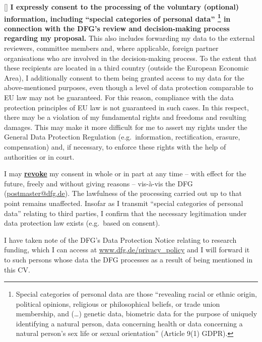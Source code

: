 \documentclass{scrartcl}
\begin{document}
\begin{small}
[\hspace{1em}]
\textbf{I expressly consent to the processing of the voluntary (optional) information, including ``special categories of personal data''%
\footnote{Special categories of personal data are those ``revealing racial or ethnic origin, political opinions, religious or philosophical beliefs, or trade union membership, and (\dots) genetic data, biometric data for the purpose of uniquely identifying a natural person, data concerning health or data concerning a natural person's sex life or sexual orientation'' (Article 9(1) GDPR).
} in connection with the DFG's review and decision-making process regarding my proposal.}
This also includes forwarding my data to the external reviewers, committee members and, where applicable, foreign partner organisations who are involved in the decision-making process.
To the extent that these recipients are located in a third country (outside the European Economic Area), I additionally consent to them being granted access to my data for the above-mentioned purposes, even though a level of data protection comparable to EU law may not be guaranteed.
For this reason, compliance with the data protection principles of EU law is not guaranteed in such cases.
In this respect, there may be a violation of my fundamental rights and freedoms and resulting damages.
This may make it more difficult for me to assert my rights under the General Data Protection Regulation (e.g.\ information, rectification, erasure, compensation) and, if necessary, to enforce these rights with the help of authorities or in court.

I may \textbf{\underline{revoke}} my consent in whole or in part at any time -- with effect for the future, freely and without giving reasons -- vis-à-vis the DFG (\href{mailto:postmaster@dfg.de}{postmaster@dfg.de}).
The lawfulness of the processing carried out up to that point remains unaffected.
Insofar as I transmit ``special categories of personal data'' relating to third parties, I confirm that the necessary legitimation under data protection law exists (e.g.\ based on consent).

I have taken note of the DFG's Data Protection Notice relating to research funding, which I can access at \href{https://www.dfg.de/privacy_policy}{www.dfg.de/privacy\_policy} and I will forward it to such persons whose data the DFG processes as a result of being mentioned in this CV.\@
\end{small}
\end{document}
